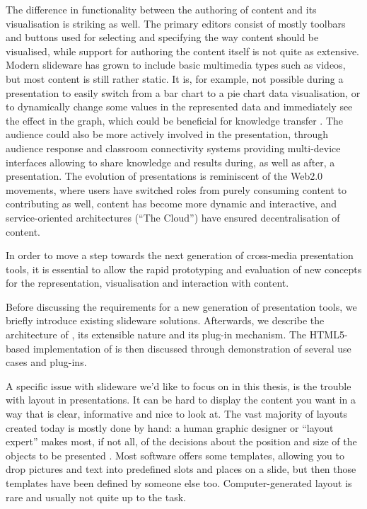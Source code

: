    The difference in functionality between the authoring of content and its
   visualisation is striking as well. The primary editors consist of mostly
   toolbars and buttons used for selecting and specifying the way content
   should be visualised, while support for authoring the content itself is not
   quite as extensive. Modern slideware has grown to include basic multimedia
   types such as videos, but most content is still rather static. It is, for
   example, not possible during a presentation to easily switch from a bar
   chart to a pie chart data visualisation, or to dynamically change some
   values in the represented data and immediately see the effect in the graph,
   which could be beneficial for knowledge transfer \citep{holzinger-1}. The
   audience could also be more actively involved in the presentation, through
   audience response and classroom connectivity systems providing multi-device
   interfaces allowing to share knowledge and results during, as well as after,
   a presentation. The evolution of presentations is reminiscent of the Web2.0
   movements, where users have switched roles from purely consuming content to
   contributing as well, content has become more dynamic and interactive, and
   service-oriented architectures (``The Cloud'') have ensured decentralisation
   of content.

   In order to move a step towards the next generation of cross-media
   presentation tools, it is essential to allow the rapid prototyping and
   evaluation of new concepts for the representation, visualisation and
   interaction with content.

   Before discussing the requirements for a new generation of presentation
   tools, we briefly introduce existing slideware solutions. Afterwards, we
   describe the architecture of \mxp, its extensible nature and its plug-in
   mechanism. The HTML5-based implementation of \mxp is then discussed through
   demonstration of several use cases and \mxp plug-ins.

   A specific issue with slideware we'd like to focus on in this thesis, is the
   trouble with layout in presentations. It can be hard to display the content
   you want in a way that is clear, informative and nice to look at. The vast
   majority of layouts created today is mostly done by hand: a human graphic
   designer or ``layout expert'' makes most, if not all, of the decisions about
   the position and size of the objects to be presented \citep{lok-1}. Most
   software offers some templates, allowing you to drop pictures and text into
   predefined slots and places on a slide, but then those templates have been
   defined by someone else too. Computer-generated layout is rare and usually
   not quite up to the task.

